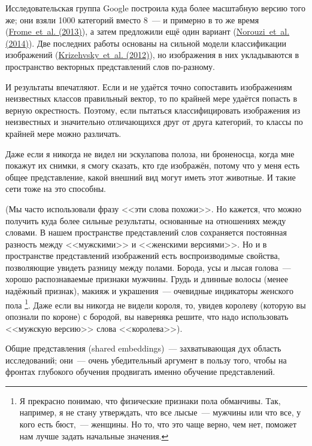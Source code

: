 \documentclass[a4paper,12pt]{article}
\begin{document}
Исследовательская группа Google построила куда более масштабную версию того же; они взяли 1000 категорий вместо 8~--- и примерно в то же время  (\href{http://static.googleusercontent.com/media/research.google.com/en//pubs/archive/41473.pdf}{Frome~et~al. (2013)}), а затем предложили ещё один вариант (\href{http://arxiv.org/pdf/1312.5650.pdf}{Norouzi~et~al. (2014)}). Две последних работы основаны на сильной модели классификации изображений (\href{http://www.cs.toronto.edu/~fritz/absps/imagenet.pdf}{Krizehvsky~et~al. (2012)}), но изображения в них укладываются в пространство векторных представлений слов по-разному.

И результаты впечатляют. Если и не удаётся точно сопоставить изображениям неизвестных классов правильный вектор, то по крайней мере удаётся попасть в верную окрестность. Поэтому, если пытаться классифицировать изображения из неизвестных и значительно отличающихся друг от друга категорий, то классы по крайней мере можно различать.

Даже если я никогда не видел ни эскулапова полоза, ни броненосца, когда мне покажут их снимки, я смогу сказать, кто где изображён, потому что у меня есть общее представление, какой внешний вид могут иметь этот животные. И такие сети тоже на это способны.

(Мы часто использовали фразу <<эти слова похожи>>. Но кажется, что можно получить куда более сильные результаты, основанные на отношениях между словами. В нашем пространстве представлений слов сохраняется постоянная разность между <<мужскими>> и <<женскими версиями>>. Но и в пространстве представлений изображений есть воспроизводимые свойства, позволяющие увидеть разницу между полами. Борода, усы и лысая голова~--- хорошо распознаваемые признаки мужчины. Грудь и длинные волосы (менее надёжный признак), макияж и украшения~--- очевидные индикаторы женского пола \footnote{Я прекрасно понимаю, что физические признаки пола обманчивы. Так, например, я не стану утверждать, что все лысые~--- мужчины или что все, у кого есть бюст,~--- женщины.  Но то, что это чаще верно, чем нет, поможет нам лучше задать начальные значения.
}. Даже если вы никогда не видели короля, то, увидев королеву (которую вы опознали по короне) с бородой, вы наверняка решите, что надо использовать <<мужскую версию>> слова <<королева>>).

Общие представления (shared embeddings)~--- захватывающая дух область исследований; они~--- очень убедительный аргумент в пользу того, чтобы на фронтах глубокого обучения продвигать именно обучение представлений.
\end{document}

